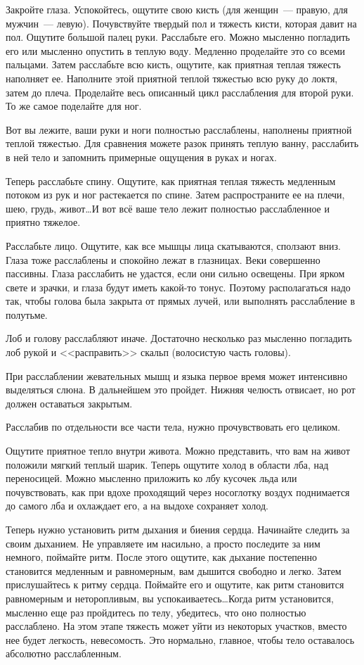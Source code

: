 \documentclass[a5paper,12pt,twoside]{memoir}
\begin{document}
Закройте глаза. Успокойтесь, ощутите свою кисть (для женщин~--- правую, для мужчин~--- левую). Почувствуйте твердый пол и тяжесть кисти, которая давит на пол. Ощутите большой палец руки. Расслабьте его. Можно мысленно погладить его или мысленно опустить в теплую воду. Медленно проделайте это со всеми пальцами. Затем расслабьте всю кисть, ощутите, как приятная теплая тяжесть наполняет ее. Наполните этой приятной теплой тяжестью всю руку до локтя, затем до плеча. Проделайте весь описанный цикл расслабления для второй руки. То же самое поделайте для ног.

Вот вы лежите, ваши руки и ноги полностью расслаблены, наполнены приятной теплой тяжестью. Для сравнения можете разок принять теплую ванну, расслабить в ней тело и запомнить примерные ощущения в руках и ногах.

Теперь расслабьте спину. Ощутите, как приятная теплая тяжесть медленным потоком из рук и ног растекается по спине. Затем распространите ее на плечи, шею, грудь, живот\ldots И вот всё ваше тело лежит полностью расслабленное и приятно тяжелое.

Расслабьте лицо. Ощутите, как все мышцы лица скатываются, сползают вниз. Глаза тоже расслаблены и спокойно лежат в глазницах. Веки совершенно пассивны. Глаза расслабить не удастся, если они сильно освещены. При ярком свете и зрачки, и глаза будут иметь какой-то тонус. Поэтому располагаться надо так, чтобы голова была закрыта от прямых лучей, или выполнять расслабление в полутьме.

Лоб и голову расслабляют иначе. Достаточно нес\-коль\-ко раз мысленно погладить лоб рукой и <<расправить>> скальп (волосистую часть головы).

При расслаблении жевательных мышц и языка первое время может интенсивно выделяться слюна. В дальнейшем это пройдет. Нижняя челюсть отвисает, но рот должен оставаться закрытым.

Расслабив по отдельности все части тела, нужно прочувствовать его целиком.  

Ощутите приятное тепло внутри живота. Можно представить, что вам на живот положили мягкий теплый шарик. Теперь ощутите холод в области лба, над переносицей. Можно мысленно приложить ко лбу кусочек льда или почувствовать, как при вдохе проходящий через носоглотку воздух поднимается до самого лба и охлаждает его, а на выдохе сохраняет холод.

Теперь нужно установить ритм дыхания и биения сердца. Начинайте следить за своим дыханием. Не управляете им насильно, а просто последите за ним немного, поймайте ритм. После этого ощутите, как дыхание постепенно становится медленным и равномерным, вам дышится свободно и легко. Затем прислушайтесь к ритму сердца. Поймайте его и ощутите, как ритм становится равномерным и неторопливым, вы успокаиваетесь\ldots Когда ритм установится, мысленно еще раз пройдитесь по телу, убедитесь, что оно полностью расслаблено. На этом этапе тяжесть может уйти из некоторых участков, вместо нее будет легкость, невесомость. Это нормально, главное, чтобы тело оставалось абсолютно расслабленным.
\end{document}
